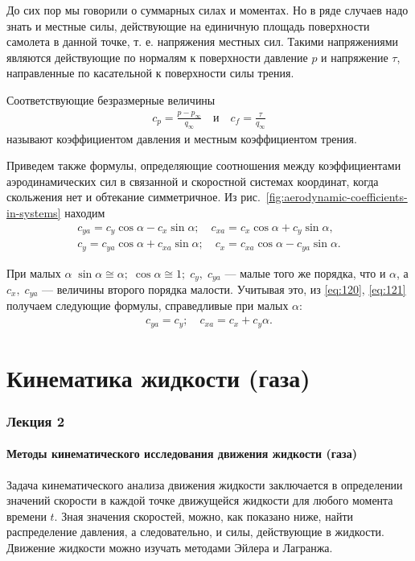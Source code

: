 	До сих пор мы говорили о суммарных силах и моментах. Но в ряде случаев надо знать и местные силы, действующие на единичную площадь поверхности самолета в данной точке, т. е. напряжения местных сил. Такими напряжениями являются действующие по нормалям к поверхности давление $p$ и напряжение $\tau$, направленные по касательной к поверхности силы трения.\par
	Соответствующие безразмерные величины
	\begin{gather}
		c_p = \frac{p - p_\infty}{q_\infty}\quad \text{и} \quad c_f = \frac{\tau}{q_\infty}
	\end{gather}
	называют коэффициентом давления и местным коэффициентом трения.\par
	Приведем также формулы, определяющие соотношения между коэффициентами аэродинамических сил в связанной и скоростной системах координат, когда скольжения нет и обтекание симметричное. Из рис.~\ref{fig:aerodynamic-coefficients-in-systems} находим
	\begin{gather}
		c_{ya} = c_y\cos{\alpha} - c_x\sin{\alpha};\quad c_{xa} = c_x\cos{\alpha} + c_y\sin{\alpha},\label{eq:120}\\
		c_{y} = c_{ya}\cos{\alpha} + c_{xa}\sin{\alpha};\quad c_{x} = c_{xa}\cos{\alpha} - c_{ya}\sin{\alpha}.\label{eq:121}
	\end{gather}\par
	При малых $\alpha \; \sin{\alpha} \cong \alpha;\; \cos{\alpha} \cong 1; \; c_y,\;c_{ya}$ --- малые того же порядка, что и $\alpha$, а $c_x,\; c_{ya}$ --- величины второго порядка малости. Учитывая это, из \eqref{eq:120}, \eqref{eq:121} получаем следующие формулы, справедливые при малых $\alpha$:
	\begin{gather}
		c_{ya} = c_y; \quad c_{xa} = c_x + c_y\alpha.
	\end{gather}
	
	\newpage
	\part{Кинематика жидкости (газа)}
	
	\section{Лекция 2}
	
	\subsection{Методы кинематического исследования движения жидкости (газа)}
	Задача кинематического анализа движения жидкости заключается в определении значений скорости в каждой точке движущейся жидкости для любого момента времени $t$. Зная значения скоростей, можно, как показано ниже, найти распределение давления, а следовательно, и силы, действующие в жидкости. Движение жидкости можно изучать методами Эйлера и Лагранжа.\par
	
